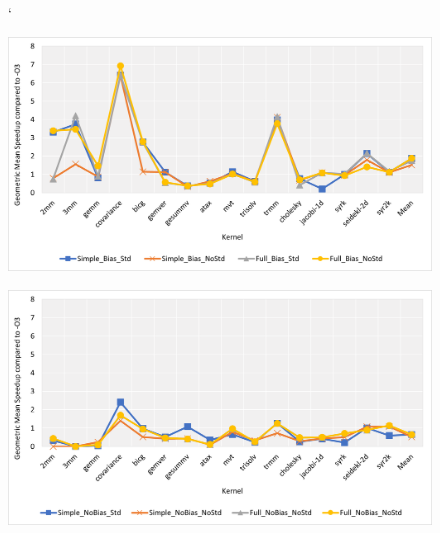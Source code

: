 \documentclass[logo,msc]{infthesis}           %
\begin{document}
\begin{figure}`
\centering
\begin{minipage}{.45\linewidth}
  \includegraphics[width=\linewidth]{Images/Bias_Chart.png}
  \label{Bias_Chart}
\end{minipage}
\hspace{.05\linewidth}
\begin{minipage}{.45\linewidth}
  \includegraphics[width=\linewidth]{Images/NoBias_Chart.png}
  \label{NoBias_Chart}
\end{minipage}
\end{figure}
\end{document}
